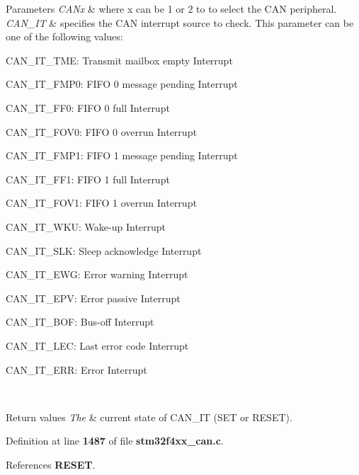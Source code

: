 \begin{DoxyParams}{Parameters}
{\em C\+A\+Nx} & where x can be 1 or 2 to to select the C\+AN peripheral. \\
\hline
{\em C\+A\+N\+\_\+\+IT} & specifies the C\+AN interrupt source to check. This parameter can be one of the following values\+: \begin{DoxyItemize}
\item C\+A\+N\+\_\+\+I\+T\+\_\+\+T\+ME\+: Transmit mailbox empty Interrupt \item C\+A\+N\+\_\+\+I\+T\+\_\+\+F\+M\+P0\+: F\+I\+FO 0 message pending Interrupt \item C\+A\+N\+\_\+\+I\+T\+\_\+\+F\+F0\+: F\+I\+FO 0 full Interrupt \item C\+A\+N\+\_\+\+I\+T\+\_\+\+F\+O\+V0\+: F\+I\+FO 0 overrun Interrupt \item C\+A\+N\+\_\+\+I\+T\+\_\+\+F\+M\+P1\+: F\+I\+FO 1 message pending Interrupt \item C\+A\+N\+\_\+\+I\+T\+\_\+\+F\+F1\+: F\+I\+FO 1 full Interrupt \item C\+A\+N\+\_\+\+I\+T\+\_\+\+F\+O\+V1\+: F\+I\+FO 1 overrun Interrupt \item C\+A\+N\+\_\+\+I\+T\+\_\+\+W\+KU\+: Wake-\/up Interrupt \item C\+A\+N\+\_\+\+I\+T\+\_\+\+S\+LK\+: Sleep acknowledge Interrupt \item C\+A\+N\+\_\+\+I\+T\+\_\+\+E\+WG\+: Error warning Interrupt \item C\+A\+N\+\_\+\+I\+T\+\_\+\+E\+PV\+: Error passive Interrupt \item C\+A\+N\+\_\+\+I\+T\+\_\+\+B\+OF\+: Bus-\/off Interrupt \item C\+A\+N\+\_\+\+I\+T\+\_\+\+L\+EC\+: Last error code Interrupt \item C\+A\+N\+\_\+\+I\+T\+\_\+\+E\+RR\+: Error Interrupt \end{DoxyItemize}
\\
\hline
\end{DoxyParams}

\begin{DoxyRetVals}{Return values}
{\em The} & current state of C\+A\+N\+\_\+\+IT (S\+ET or R\+E\+S\+ET). \\
\hline
\end{DoxyRetVals}


Definition at line \textbf{ 1487} of file \textbf{ stm32f4xx\+\_\+can.\+c}.



References \textbf{ R\+E\+S\+ET}.


